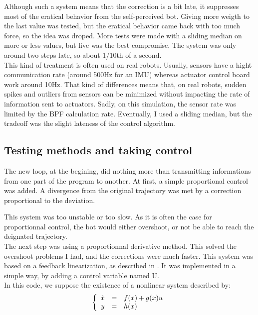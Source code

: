 Although such a system means that the correction is a bit late, it suppresses most of the eratical behavior from the self-perceived bot.
Giving more weigth to the last value was tested, but the eratical behavior came back with too much force, so the idea was droped.
More tests were made with a sliding median on more or less values, but five was the best compromise.
The system was only around two steps late, so about 1/10th of a second.\\

This kind of treatment is often used on real robots.
Usually, sensors have a hight communication rate (around 500Hz for an IMU) whereas actuator control board work around 10Hz.
That kind of differences means that, on real robots, sudden spikes and outliers from sensors can be minimized without impacting the rate of information sent to actuators.
Sadly, on this simulation, the sensor rate was limited by the BPF calculation rate.
Eventually, I used a sliding median, but the tradeoff was the slight lateness of the control algorithm.\\

\subsection{Testing methods and taking control}

The new loop, at the begining, did nothing more than transmitting informations from one part of the program to another.
At first, a simple proportional control was added. A divergence from the original trajectory was met by a correction proportional to the deviation.

This system was too unstable or too slow.
As it is often the case for proportionnal control, the bot would either overshoot, or not be able to reach the deignated trajectory.\\

The next step was using a proportionnal derivative method. This solved the overshoot problems I had, and the corrections were much faster.
This system was based on a feedback linearization, as described in \parencite{ROBMOOC}.
It was implemented in a simple way, by adding a control variable named U.\\



In this code, we suppose the existence of a nonlinear system described by:\\

\begin{equation}
\left \{
\begin{array}{r c l}
   \dot{x} & = & f(x) + g(x)u \\
   y & = & h(x)
\end{array}
\right .
\end{equation}

